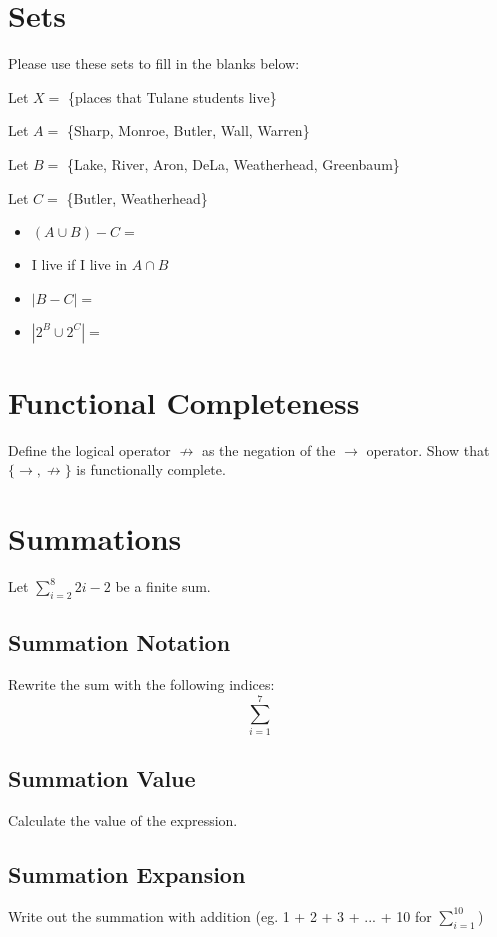 \documentclass{article}
\begin{document}
\newpage

\section{Sets}
Please use these sets to fill in the blanks below:

Let $X =$ \{places that Tulane students live\}

Let $A = $ \{Sharp, Monroe, Butler, Wall, Warren\}

Let $B =$ \{Lake, River, Aron, DeLa, Weatherhead, Greenbaum\}

Let $C =$ \{Butler, Weatherhead\}

\begin{itemize}
    \item $(A \cup B) - C = $
    \item I live \hspace{2cm} if I live in $A \cap B$
    \item $|B - C| = $
    \item $|2^{B} \cup 2^{C}| = $
\end{itemize}

\section{Functional Completeness}
Define the logical operator $\not\to$ as the negation of the $\to$ operator. Show that $\{\to, \not\to\}$ is functionally complete.

\newpage

\section{Summations}
Let $\sum_{i=2}^8 2i-2$ be a finite sum.

\subsection{Summation Notation}
Rewrite the sum with the following indices:
$$\sum_{i=1}^7 $$
\vspace{3cm}

\subsection{Summation Value}
Calculate the value of the expression.

\vspace{3cm}

\subsection{Summation Expansion}
Write out the summation with addition (eg. 1 + 2 + 3 + ... + 10 for $\sum_{i=1}^{10} $)
\end{document}
